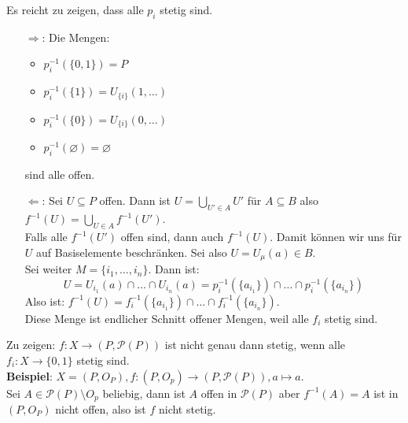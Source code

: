 \begin{problem*}[3a]
  Es reicht zu zeigen, dass alle \( p_i \) stetig sind.
  \begin{itemize}
    \item[\( \Rightarrow \):] Die Mengen:
    \begin{itemize}
      \item \( p_i^{-1}(\{ 0,1 \}) = P \)
      \item \( p_i^{-1}(\{ 1 \}) = U_{\{ i \}}(1,\dots) \)
      \item \( p_i^{-1}(\{ 0 \}) = U_{\{ i \}}(0,\dots) \) 
      \item \( p_i^{-1}(\varnothing) = \varnothing \)
    \end{itemize}
    sind alle offen.

    \item[\( \Leftarrow \):] Sei \( U \subseteq P \) offen. Dann ist \( U = \bigcup_{U' \in A}U' \) für \( A \subseteq B \) also \( f^{-1}(U) = \bigcup_{U \in A} f^{-1}(U') \). \\
    Falls alle \( f^{-1}(U') \) offen sind, dann auch \( f^{-1}(U) \). Damit können wir uns für \( U \) auf Basiselemente beschränken. Sei also \( U = U_\mu(a) \in B \). \\
    Sei weiter \( M = \{ i_1, \dots,i_n \} \). Dann ist:
    \begin{equation*}
      U = U_{i_1}(a)\cap \dots \cap U_{i_n}(a) = p_i^{-1}(\{ a_{i_1} \}) \cap \dots \cap p_i^{-1}(\{ a_{i_n} \})
    \end{equation*}
    Also ist: \( f^{-1}(U) = f_i^{-1}(\{ a_{i_1} \}) \cap \dots \cap f_i^{-1}(\{ a_{i_n} \}) \). \\
    Diese Menge ist endlicher Schnitt offener Mengen, weil alle \( f_i \) stetig sind.
  \end{itemize}
\end{problem*}

\begin{problem*}[3b]
  Zu zeigen: \( f: X \to (P,\mathcal{P}(P)) \) ist nicht genau dann stetig, wenn alle \( f_i: X \to \{ 0,1 \} \) stetig sind. \\
  \textbf{Beispiel}: \( X = (P, O_P), f: (P, O_p) \to (P, \mathcal{P}(P)), a \mapsto a \). \\
  Sei \( A \in \mathcal{P}(P) \setminus O_p \) beliebig, dann ist \( A \) offen in \( \mathcal{P}(P) \) aber 
  \( f^{-1}(A) = A \) ist in \( (P, O_P) \) nicht offen, also ist \( f \) nicht stetig.
\end{problem*}



